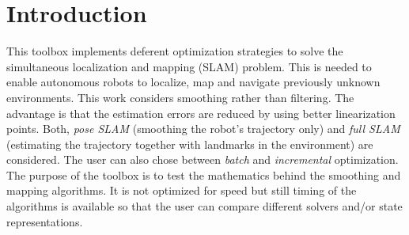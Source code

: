 \documentclass{article}
\begin{document}
\section{Introduction}
This toolbox implements deferent optimization strategies to solve the simultaneous localization and mapping (SLAM) problem. This is needed to enable autonomous robots to localize, map and navigate previously unknown environments. This work considers smoothing rather than filtering. The advantage is that the estimation errors are reduced by using 
better linearization points. Both, \emph{pose SLAM} (smoothing the robot's trajectory only) and \emph{full SLAM} (estimating the trajectory together with landmarks in the environment) are considered. The user can also chose between \emph{batch} and \emph{incremental} optimization. 
\\
The purpose of the toolbox is to test the mathematics behind the smoothing and mapping algorithms. It is not optimized for speed but still timing of the algorithms is available so that the user can compare different solvers and/or state representations.
\\
\end{document}
